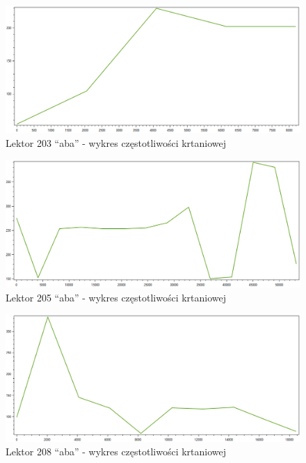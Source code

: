 \documentclass[12pt,a4paper]{article}
\begin{document}
        \begin{figure}[h!]
            \centering
            \includegraphics[width=1.0\textwidth]{figures/aba_203_f0.png}
            \caption{Lektor 203 ``aba'' - wykres częstotliwości krtaniowej}
            \label{fig:aba_203_f0}
        \end{figure}

        \begin{figure}[h!]
            \centering
            \includegraphics[width=1.0\textwidth]{figures/aba_205_f0.png}
            \caption{Lektor 205 ``aba'' - wykres częstotliwości krtaniowej}
            \label{fig:aba_205_f0}
        \end{figure}

        \begin{figure}[h!]
            \centering
            \includegraphics[width=1.0\textwidth]{figures/aba_208_f0.png}
            \caption{Lektor 208 ``aba'' - wykres częstotliwości krtaniowej}
            \label{fig:aba_208_f0}
        \end{figure}
\end{document}
